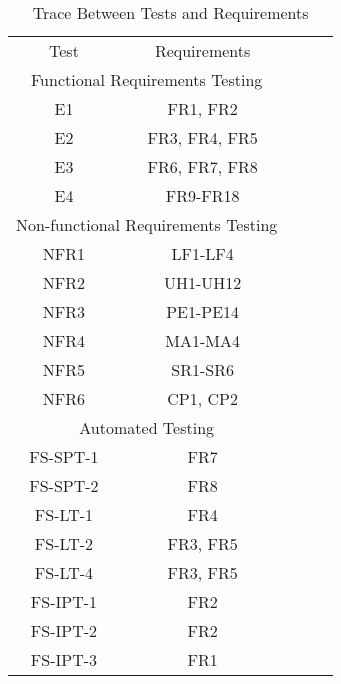 \documentclass[12pt, titlepage]{article}
\begin{document}
\begin{table}[H]
\centering
\begin{tabular}{|cc|lll}
\cline{1-2}
\multicolumn{1}{|c|}{Test} & Requirements & \multicolumn{1}{c}{} & \multicolumn{1}{c}{} &  \\ \cline{1-2}
\multicolumn{2}{|c|}{Functional Requirements Testing} &  &  &  \\ \cline{1-2}
\multicolumn{1}{|c|}{E1} & FR1, FR2 &  &  &  \\ \cline{1-2}
\multicolumn{1}{|c|}{E2} & FR3, FR4, FR5 &  &  &  \\ \cline{1-2}
\multicolumn{1}{|c|}{E3} & FR6, FR7, FR8 &  &  &  \\ \cline{1-2}
\multicolumn{1}{|c|}{E4} & FR9-FR18 &  &  &  \\ \cline{1-2}

\multicolumn{2}{|c|}{Non-functional Requirements Testing} &  &  &  \\ \cline{1-2}
\multicolumn{1}{|c|}{NFR1} & LF1-LF4 &  &  &  \\ \cline{1-2}
\multicolumn{1}{|c|}{NFR2} & UH1-UH12 &  &  &  \\ \cline{1-2}
\multicolumn{1}{|c|}{NFR3} & PE1-PE14 &  &  &  \\ \cline{1-2}
\multicolumn{1}{|c|}{NFR4} & MA1-MA4 &  &  &  \\ \cline{1-2}
\multicolumn{1}{|c|}{NFR5} & SR1-SR6 &  &  &  \\ \cline{1-2}
\multicolumn{1}{|c|}{NFR6} & CP1, CP2&  &  &  \\ \cline{1-2}

\multicolumn{2}{|c|}{Automated Testing} &  &  &  \\ \cline{1-2}
\multicolumn{1}{|c|}{FS-SPT-1} & FR7 &  &  &  \\ \cline{1-2}
\multicolumn{1}{|c|}{FS-SPT-2} & FR8 &  &  &  \\ \cline{1-2}
\multicolumn{1}{|c|}{FS-LT-1} & FR4 &  &  &  \\ \cline{1-2}
\multicolumn{1}{|c|}{FS-LT-2} & FR3, FR5 &  &  &  \\ \cline{1-2}
\multicolumn{1}{|c|}{FS-LT-4} & FR3, FR5&  &  &  \\ \cline{1-2}
\multicolumn{1}{|c|}{FS-IPT-1} & FR2 &  &  &  \\ \cline{1-2}
\multicolumn{1}{|c|}{FS-IPT-2} & FR2 &  &  &  \\ \cline{1-2}
\multicolumn{1}{|c|}{FS-IPT-3} & FR1 &  &  &  \\ \cline{1-2}




\end{tabular}
\caption{Trace Between Tests and Requirements}
\label{tab:my-table}
\end{table}	
		
\end{document}
